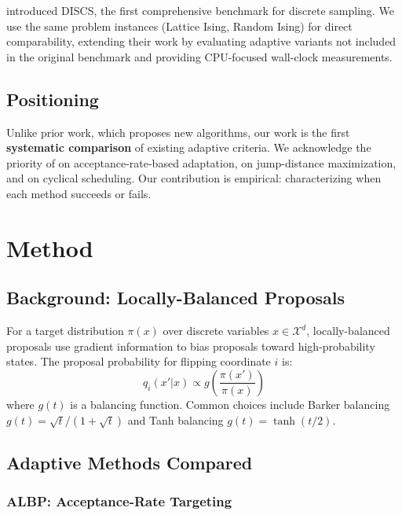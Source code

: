\documentclass{article}
\begin{document}
\citet{goshvadi2023discs} introduced DISCS, the first comprehensive benchmark for discrete sampling. We use the same problem instances (Lattice Ising, Random Ising) for direct comparability, extending their work by evaluating adaptive variants not included in the original benchmark and providing CPU-focused wall-clock measurements.

\subsection{Positioning}

Unlike prior work, which proposes new algorithms, our work is the first \textbf{systematic comparison} of existing adaptive criteria. We acknowledge the priority of \citet{sun2022optimal} on acceptance-rate-based adaptation, \citet{sun2023anyscale} on jump-distance maximization, and \citet{pynadath2024gradient} on cyclical scheduling. Our contribution is empirical: characterizing when each method succeeds or fails.

\section{Method}
\label{sec:method}

\subsection{Background: Locally-Balanced Proposals}

For a target distribution $\pi(x)$ over discrete variables $x \in \mathcal{X}^d$, locally-balanced proposals \citep{zanella2020informed} use gradient information to bias proposals toward high-probability states. The proposal probability for flipping coordinate $i$ is:
\begin{equation}
    q_i(x' | x) \propto g\left(\frac{\pi(x')}{\pi(x)}\right)
\end{equation}
where $g(t)$ is a balancing function. Common choices include Barker balancing $g(t) = \sqrt{t}/(1+\sqrt{t})$ and Tanh balancing $g(t) = \tanh(t/2)$.

\subsection{Adaptive Methods Compared}

\subsubsection{ALBP: Acceptance-Rate Targeting}
\end{document}
